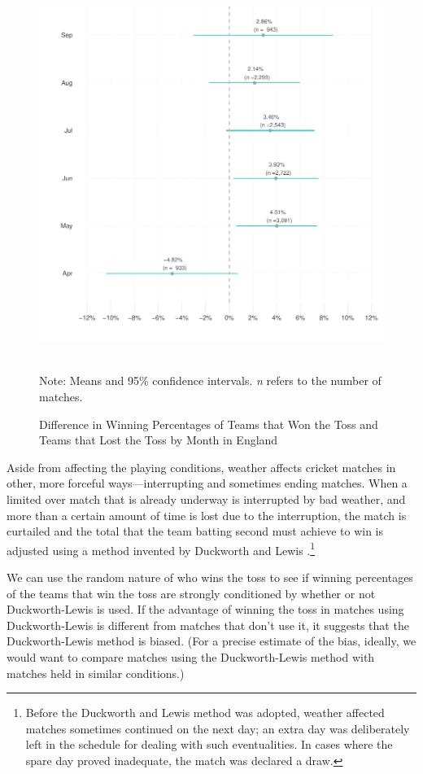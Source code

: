 \documentclass[12pt]{article}
\begin{document}
\begin{figure}[htbp]
\centering
\caption{Difference in Winning Percentages of Teams that Won the Toss and Teams that Lost the Toss by Month in England}
\includegraphics[scale=1]{../figs/winbyMonthEngland.pdf}
{\footnotesize \\ Note: Means and 95\% confidence intervals. \emph{n} refers to the number of matches.\par}
\label{fig:season}
\end{figure}

Aside from affecting the playing conditions, weather affects cricket matches in other, more forceful ways---interrupting and sometimes ending matches. When a limited over match that is already underway is interrupted by bad weather, and more than a certain amount of time is lost due to the interruption, the match is curtailed and the total that the team batting second must achieve to win is adjusted using a method invented by Duckworth and Lewis \citep[see][]{duckworth1998}.\footnote{Before the Duckworth and Lewis method was adopted, weather affected matches sometimes continued on the next day; an extra day was deliberately left in the schedule for dealing with such eventualities. In cases where the spare day proved inadequate, the match was declared a draw.} 

We can use the random nature of who wins the toss to see if winning percentages of the teams that win the toss are strongly conditioned by whether or not Duckworth-Lewis is used. If the advantage of winning the toss in matches using Duckworth-Lewis is different from matches that don't use it, it suggests that the Duckworth-Lewis method is biased. (For a precise estimate of the bias, ideally, we would want to compare matches using the Duckworth-Lewis method with matches held in similar conditions.)
\end{document}

